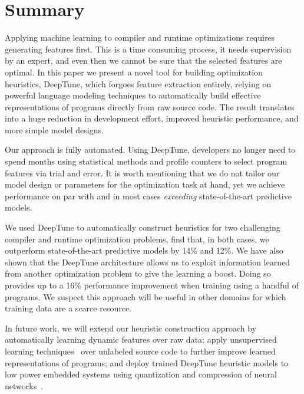 \section{Summary}%
\label{sec:conclusion}

Applying machine learning to compiler and runtime optimizations requires generating features first. This is a time consuming process, it needs supervision by an expert, and even then we cannot be sure that the selected features are optimal. In this paper we present a novel tool for building optimization heuristics, DeepTune, which forgoes feature extraction entirely, relying on powerful language modeling techniques to automatically build effective representations of programs directly from raw source code. The result translates into a huge reduction in development effort, improved heuristic performance, and more simple model designs.

Our approach is fully automated. Using DeepTune, developers no longer need to spend months using statistical methods and profile counters to select program features via trial and error. It is worth mentioning that we do not tailor our model design or parameters for the optimization task at hand, yet we achieve performance on par with and in most cases \emph{exceeding} state-of-the-art predictive models.

We used DeepTune to automatically construct heuristics for two challenging compiler and runtime optimization problems, find that, in both cases, we outperform state-of-the-art predictive models by 14\% and 12\%. We have also shown that the DeepTune architecture allows us to exploit information learned from another optimization problem to give the learning a boost. Doing so provides up to a 16\% performance improvement when training using a handful of programs. We suspect this approach will be useful in other domains for which training data are a scarce resource.

In future work, we will extend our heuristic construction approach by automatically learning dynamic features over raw data; apply unsupervised learning techniques~\cite{Le2012} over unlabeled source code to further improve learned representations of programs; and deploy trained DeepTune heuristic models to low power embedded systems using quantization and compression of neural networks~\cite{Han2015}.

